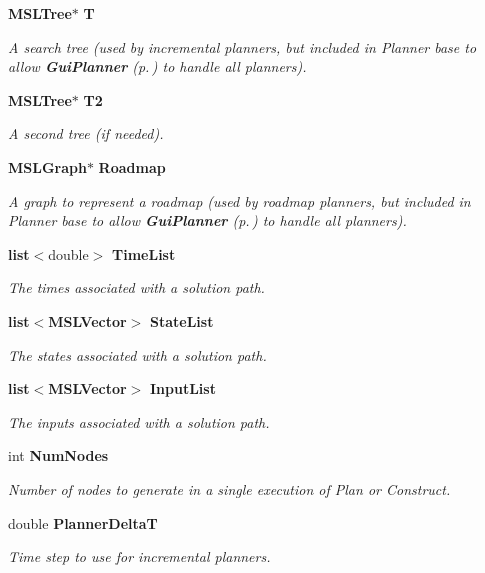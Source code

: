\begin{CompactItemize}
{\bf MSLTree}$\ast$ {\bf T}
\begin{CompactList}\small\item\em A search tree (used by incremental planners, but included in Planner base to allow {\bf Gui\-Planner} {\rm (p.\,\pageref{classGuiPlanner})} to handle all planners).\item\end{CompactList}\item 
{\bf MSLTree}$\ast$ {\bf T2}
\begin{CompactList}\small\item\em A second tree (if needed).\item\end{CompactList}\item 
{\bf MSLGraph}$\ast$ {\bf Roadmap}
\begin{CompactList}\small\item\em A graph to represent a roadmap (used by roadmap planners, but included in Planner base to allow {\bf Gui\-Planner} {\rm (p.\,\pageref{classGuiPlanner})} to handle all planners).\item\end{CompactList}\item 
{\bf list}$<$double$>$ {\bf Time\-List}
\begin{CompactList}\small\item\em The times associated with a solution path.\item\end{CompactList}\item 
{\bf list}$<${\bf MSLVector}$>$ {\bf State\-List}
\begin{CompactList}\small\item\em The states associated with a solution path.\item\end{CompactList}\item 
{\bf list}$<${\bf MSLVector}$>$ {\bf Input\-List}
\begin{CompactList}\small\item\em The inputs associated with a solution path.\item\end{CompactList}\item 
int {\bf Num\-Nodes}
\begin{CompactList}\small\item\em Number of nodes to generate in a single execution of Plan or Construct.\item\end{CompactList}\item 
double {\bf Planner\-Delta\-T}
\begin{CompactList}\small\item\em Time step to use for incremental planners.\item\end{CompactList}\end{CompactItemize}
